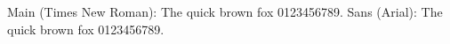 \documentclass{article}
\begin{document}
Main (Times New Roman): The quick brown fox 0123456789.
{\arial Sans (Arial): The quick brown fox 0123456789.}
\end{document}
